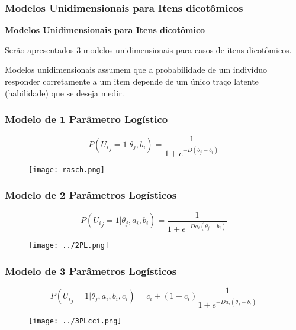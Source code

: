\documentclass{beamer}
\begin{document}
	
	\begin{frame}
		
		\frametitle{Modelos Unidimensionais para Itens dicotômicos}
		
		\begin{center}
			\textbf{Modelos Unidimensionais para Itens dicotômico}
		\end{center}
		
		Serão apresentados 3 modelos unidimensionais para casos de itens dicotômicos. 
		
		Modelos unidimensionais assumem que a probabilidade de um indivíduo responder corretamente a um item depende de um único traço latente (habilidade) que se deseja medir. 
		

	\end{frame}
	
	
	\begin{frame}
		
		\frametitle{Modelo de 1 Parâmetro Logístico}
		
		\[
				P({U_i}_j = 1|{\theta}_j, b_i) = 
				\frac{1}{1+e^{-D(\theta_j - b_i)}}
		\]
		\begin{figure}
		\texttt{[image: rasch.png]}
		\end{figure}

	\end{frame}
	
	
	\begin{frame}
		
		\frametitle{Modelo de 2 Parâmetros Logísticos}
		
		\[
			P({U_i}_j = 1|{\theta}_j, a_i, b_i) =
			\frac{1}{1+e^{-Da_i(\theta_j- b_i)}}
		\]
		
		\begin{figure}
			\texttt{[image: ../2PL.png]}
		\end{figure}

		
	\end{frame}
	
	
	\begin{frame}
		
		\frametitle{Modelo de 3 Parâmetros Logísticos}
		\[
			P({U_i}_j = 1|{\theta}_j, a_i, b_i, c_i) =
			c_i+(1-c_i)\frac{1}{1+e^{-Da_i(\theta_j- b_i)}}
		\]
		\begin{figure}
			\texttt{[image: ../3PLcci.png]}
		\end{figure}

		
	\end{frame}
\end{document}
